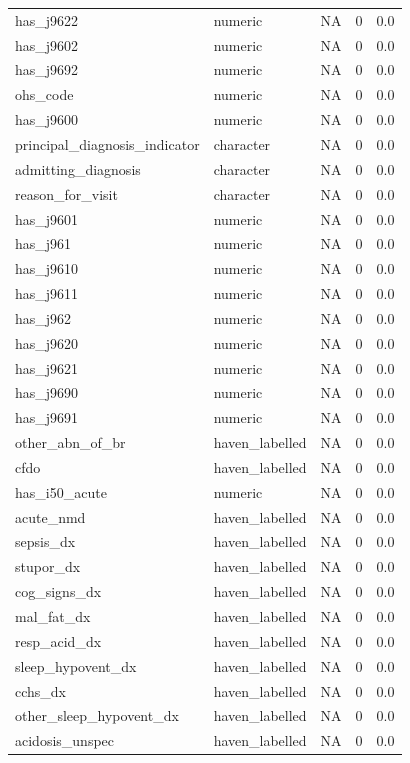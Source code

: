 \documentclass[
  11pt,
  letterpaper,
  DIV=11,
  numbers=noendperiod]{scrartcl}
\begin{document}
\begin{longtable*}{llrrr}
\addlinespace
has\_j9622 & numeric & NA & 0 & 0.0\\
has\_j9602 & numeric & NA & 0 & 0.0\\
has\_j9692 & numeric & NA & 0 & 0.0\\
ohs\_code & numeric & NA & 0 & 0.0\\
has\_j9600 & numeric & NA & 0 & 0.0\\
\addlinespace
principal\_diagnosis\_indicator & character & NA & 0 & 0.0\\
admitting\_diagnosis & character & NA & 0 & 0.0\\
reason\_for\_visit & character & NA & 0 & 0.0\\
has\_j9601 & numeric & NA & 0 & 0.0\\
has\_j961 & numeric & NA & 0 & 0.0\\
\addlinespace
has\_j9610 & numeric & NA & 0 & 0.0\\
has\_j9611 & numeric & NA & 0 & 0.0\\
has\_j962 & numeric & NA & 0 & 0.0\\
has\_j9620 & numeric & NA & 0 & 0.0\\
has\_j9621 & numeric & NA & 0 & 0.0\\
\addlinespace
has\_j9690 & numeric & NA & 0 & 0.0\\
has\_j9691 & numeric & NA & 0 & 0.0\\
other\_abn\_of\_br & haven\_labelled & NA & 0 & 0.0\\
cfdo & haven\_labelled & NA & 0 & 0.0\\
has\_i50\_acute & numeric & NA & 0 & 0.0\\
\addlinespace
acute\_nmd & haven\_labelled & NA & 0 & 0.0\\
sepsis\_dx & haven\_labelled & NA & 0 & 0.0\\
stupor\_dx & haven\_labelled & NA & 0 & 0.0\\
cog\_signs\_dx & haven\_labelled & NA & 0 & 0.0\\
mal\_fat\_dx & haven\_labelled & NA & 0 & 0.0\\
\addlinespace
resp\_acid\_dx & haven\_labelled & NA & 0 & 0.0\\
sleep\_hypovent\_dx & haven\_labelled & NA & 0 & 0.0\\
cchs\_dx & haven\_labelled & NA & 0 & 0.0\\
other\_sleep\_hypovent\_dx & haven\_labelled & NA & 0 & 0.0\\
acidosis\_unspec & haven\_labelled & NA & 0 & 0.0\\

\end{longtable*}
\end{document}
